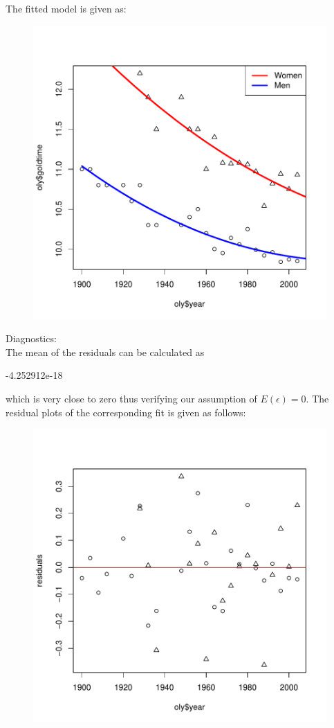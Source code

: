 \documentclass[12pt]{article}
\begin{document}
\clearpage
The fitted model is given as:
\begin{figure}[H]
\includegraphics{HW4-015}
\end{figure}
Diagnostics:\\
The mean of the residuals can be calculated as 
\begin{Schunk}
\begin{Soutput}
[1] -4.252912e-18
\end{Soutput}
\end{Schunk}
which is very close to zero thus verifying our assumption of $E(\epsilon)=0$.
\clearpage
The residual plots of the corresponding fit is given as follows:
\begin{figure}[H]
\includegraphics{HW4-017}
\end{figure}
\end{document}
